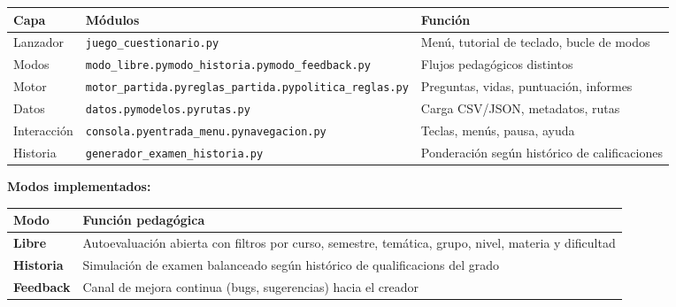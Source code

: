\documentclass[11pt,a4paper]{article}
\newcommand{\bloquetfg}[1]{\par\smallskip\noindent #1\par}
\newcommand{\iniciotabla}{\par\medskip\renewcommand{\arraystretch}{1.12}}
\newcommand{\fintabla}{\par\medskip}
\begin{document}
\iniciotabla
\begin{tabularx}{\linewidth}{@{}>{\raggedright\arraybackslash}p{2.1cm}>{\raggedright\arraybackslash}p{5.4cm}>{\raggedright\arraybackslash}X@{}}
\toprule
\textbf{Capa} & \textbf{Módulos} & \textbf{Función} \\
\midrule
Lanzador & \texttt{juego\_cuestionario.py} & Menú, tutorial de teclado, bucle de modos \\
Modos & \texttt{modo\_libre.py}\newline\texttt{modo\_historia.py}\newline\texttt{modo\_feedback.py} & Flujos pedagógicos distintos \\
Motor & \texttt{motor\_partida.py}\newline\texttt{reglas\_partida.py}\newline\texttt{politica\_reglas.py} & Preguntas, vidas, puntuación, informes \\
Datos & \texttt{datos.py}\newline\texttt{modelos.py}\newline\texttt{rutas.py} & Carga CSV/JSON, metadatos, rutas \\
Interacción & \texttt{consola.py}\newline\texttt{entrada\_menu.py}\newline\texttt{navegacion.py} & Teclas, menús, pausa, ayuda \\
Historia & \texttt{generador\_examen\_historia.py} & Ponderación según histórico de calificaciones \\
\bottomrule
\end{tabularx}
\fintabla

\bloquetfg{\textbf{Modos implementados:}}
\iniciotabla
\begin{tabular}{@{}lp{9cm}@{}}
\toprule
\textbf{Modo} & \textbf{Función pedagógica} \\
\midrule
\textbf{Libre} & Autoevaluación abierta con filtros por curso, semestre, temática, grupo, nivel, materia y dificultad \\
\textbf{Historia} & Simulación de examen balanceado según histórico de qualificacions del grado \\
\textbf{Feedback} & Canal de mejora continua (bugs, sugerencias) hacia el creador \\
\bottomrule
\end{tabular}
\fintabla
\end{document}
